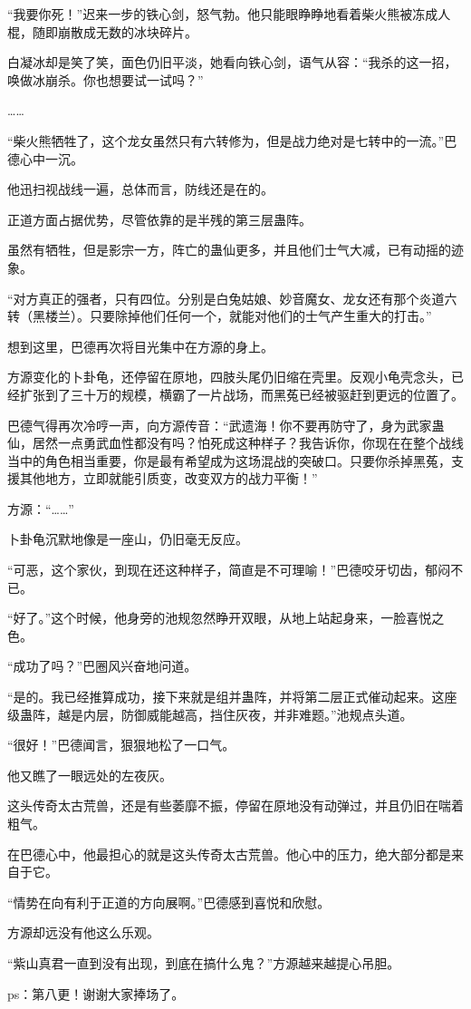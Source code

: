 \begin{this_body}
“我要你死！”迟来一步的铁心剑，怒气勃。他只能眼睁睁地看着柴火熊被冻成人棍，随即崩散成无数的冰块碎片。

白凝冰却是笑了笑，面色仍旧平淡，她看向铁心剑，语气从容：“我杀的这一招，唤做冰崩杀。你也想要试一试吗？”

……

“柴火熊牺牲了，这个龙女虽然只有六转修为，但是战力绝对是七转中的一流。”巴德心中一沉。

他迅扫视战线一遍，总体而言，防线还是在的。

正道方面占据优势，尽管依靠的是半残的第三层蛊阵。

虽然有牺牲，但是影宗一方，阵亡的蛊仙更多，并且他们士气大减，已有动摇的迹象。

“对方真正的强者，只有四位。分别是白兔姑娘、妙音魔女、龙女还有那个炎道六转（黑楼兰）。只要除掉他们任何一个，就能对他们的士气产生重大的打击。”

想到这里，巴德再次将目光集中在方源的身上。

方源变化的卜卦龟，还停留在原地，四肢头尾仍旧缩在壳里。反观小龟壳念头，已经扩张到了三十万的规模，横霸了一片战场，而黑菟已经被驱赶到更远的位置了。

巴德气得再次冷哼一声，向方源传音：“武遗海！你不要再防守了，身为武家蛊仙，居然一点勇武血性都没有吗？怕死成这种样子？我告诉你，你现在在整个战线当中的角色相当重要，你是最有希望成为这场混战的突破口。只要你杀掉黑菟，支援其他地方，立即就能引质变，改变双方的战力平衡！”

方源：“……”

卜卦龟沉默地像是一座山，仍旧毫无反应。

“可恶，这个家伙，到现在还这种样子，简直是不可理喻！”巴德咬牙切齿，郁闷不已。

“好了。”这个时候，他身旁的池规忽然睁开双眼，从地上站起身来，一脸喜悦之色。

“成功了吗？”巴圈风兴奋地问道。

“是的。我已经推算成功，接下来就是组并蛊阵，并将第二层正式催动起来。这座级蛊阵，越是内层，防御威能越高，挡住灰夜，并非难题。”池规点头道。

“很好！”巴德闻言，狠狠地松了一口气。

他又瞧了一眼远处的左夜灰。

这头传奇太古荒兽，还是有些萎靡不振，停留在原地没有动弹过，并且仍旧在喘着粗气。

在巴德心中，他最担心的就是这头传奇太古荒兽。他心中的压力，绝大部分都是来自于它。

“情势在向有利于正道的方向展啊。”巴德感到喜悦和欣慰。

方源却远没有他这么乐观。

“紫山真君一直到没有出现，到底在搞什么鬼？”方源越来越提心吊胆。

ps：第八更！谢谢大家捧场了。

\end{this_body}

